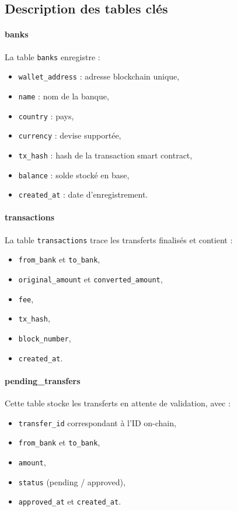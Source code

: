 \documentclass[a4paper,12pt]{report}
\begin{document}
\subsection{Description des tables clés}
\paragraph{banks}
La table \texttt{banks} enregistre :
\begin{itemize}[leftmargin=*,nosep]
  \item \texttt{wallet\_address} : adresse blockchain unique,
  \item \texttt{name} : nom de la banque,
  \item \texttt{country} : pays,
  \item \texttt{currency} : devise supportée,
  \item \texttt{tx\_hash} : hash de la transaction smart contract,
  \item \texttt{balance} : solde stocké en base,
  \item \texttt{created\_at} : date d'enregistrement.
\end{itemize}

\paragraph{transactions}
La table \texttt{transactions} trace les transferts finalisés et contient :
\begin{itemize}[leftmargin=*,nosep]
  \item \texttt{from\_bank} et \texttt{to\_bank},
  \item \texttt{original\_amount} et \texttt{converted\_amount},
  \item \texttt{fee},
  \item \texttt{tx\_hash},
  \item \texttt{block\_number},
  \item \texttt{created\_at}.
\end{itemize}

\paragraph{pending\_transfers}
Cette table stocke les transferts en attente de validation, avec :
\begin{itemize}[leftmargin=*,nosep]
  \item \texttt{transfer\_id} correspondant à l'ID on-chain,
  \item \texttt{from\_bank} et \texttt{to\_bank},
  \item \texttt{amount},
  \item \texttt{status} (pending / approved),
  \item \texttt{approved\_at} et \texttt{created\_at}.
\end{itemize}
\end{document}
